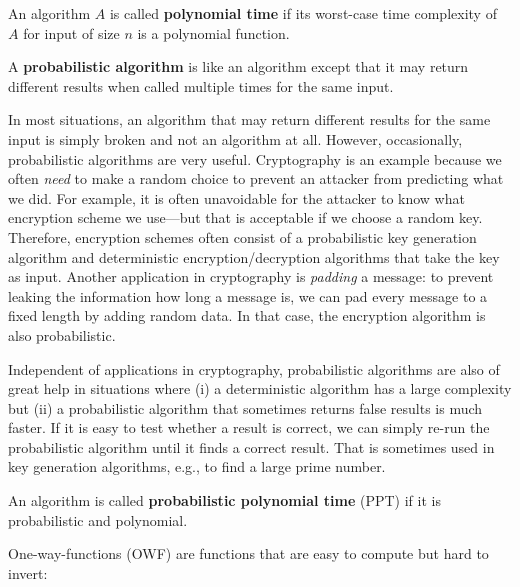 \begin{definition}
 An algorithm $A$ is called \textbf{polynomial time} if its worst-case time complexity of $A$ for input of size $n$ is a polynomial function.
\end{definition}

\begin{definition}
 A \textbf{probabilistic algorithm} is like an algorithm except that it may return different results when called multiple times for the same input.
\end{definition}

In most situations, an algorithm that may return different results for the same input is simply broken and not an algorithm at all.
However, occasionally, probabilistic algorithms are very useful.
Cryptography is an example because we often \emph{need} to make a random choice to prevent an attacker from predicting what we did.
For example, it is often unavoidable for the attacker to know what encryption scheme we use---but that is acceptable if we choose a random key.
Therefore, encryption schemes often consist of a probabilistic key generation algorithm and deterministic encryption/decryption algorithms that take the key as input.
Another application in cryptography is \emph{padding} a message: to prevent leaking the information how long a message is, we can pad every message to a fixed length by adding random data.
In that case, the encryption algorithm is also probabilistic.

Independent of applications in cryptography, probabilistic algorithms are also of great help in situations where (i) a deterministic algorithm has a large complexity but (ii) a probabilistic algorithm that sometimes returns false results is much faster.
If it is easy to test whether a result is correct, we can simply re-run the probabilistic algorithm until it finds a correct result.
That is sometimes used in key generation algorithms, e.g., to find a large prime number.

\begin{definition}
 An algorithm is called \textbf{probabilistic polynomial time} (PPT) if it is probabilistic and polynomial.
\end{definition}

One-way-functions (OWF) are functions that are easy to compute but hard to invert:

